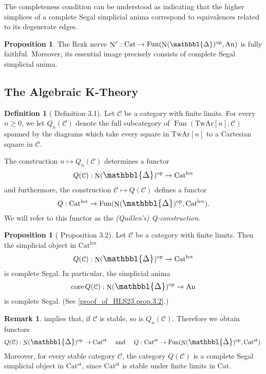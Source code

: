 \documentclass[a4paper,dvipdfmx,11pt,reqno]{amsart}
\DeclareMathOperator{\myop}{op}
\DeclareMathOperator{\N}{N}
\DeclareMathOperator{\Fun}{Fun}
\newcommand{\C}{\mathcal{C}}
\DeclareMathOperator{\core}{core}
\newcommand{\An}{\mathrm{An}}
\newcommand{\Cat}{\mathrm{Cat}}
\newcommand{\Catlex}{\mathrm{Cat^{lex}}}
\newcommand{\Catst}{\mathrm{Cat^{st}}}
\newcommand{\TwAr}{\mathrm{TwAr}}
\newcommand{\prism}{{\mathlarger{\mathbbl{\Delta}}}}
\theoremstyle{definition}
\newtheorem{definition}[theorem]{Definition}
\newtheorem{proposition}[theorem]{Proposition}
\newtheorem{remark}[theorem]{Remark}
\begin{document}
The completeness condition can be understood as indicating that the higher simplices of a complete Segal simplicial anima correspond to equivalences related to its degenerate edges.

\begin{proposition}
  The Rezk nerve $\N^r : \Cat \to \Fun(\N(\prism)^{\myop},\An)$ is fully faithful.
  Moreover, its essential image precisely consists of complete Segal simplicial anima.
\end{proposition}

\subsection{The Algebraic K-Theory}

\begin{definition}[\cite{HLS23} Definition 3.1] \label{HLS23.def.3.1}
  Let $\C$ be a category with finite limits.
  For every $n \geq 0$, we let $Q_{n}(\C)$ denote the full subcategory of $\Fun(\TwAr[n],\C)$ spanned by the diagrams which take every square in $\TwAr[n]$ to a Cartesian square in $\C$.

  The construction $n \mapsto Q_{n}(\C)$ determines a functor 
  \begin{align*}
    Q(\C) : \N(\prism)^{\myop} \to \Catlex
  \end{align*}
  and furthermore, the construction $\C \mapsto Q(\C)$ defines a functor 
  \begin{align*}
    Q : \Catlex \to \Fun(\N(\prism)^{\myop},\Catlex).
  \end{align*}
  We will refer to this functor as the \textit{(Quillen's) Q-construction}.
\end{definition}

\begin{proposition}[\cite{HLS23} Proposition 3.2] \label{HLS23.prop.3.2}
  Let $\C$ be a category with finite limits.
  Then the simplicial object in $\Catlex$
  \begin{align*}
    Q(\C) : \N(\prism)^{\myop} \to \Catlex
  \end{align*}
  is complete Segal.
  In particular, the simplicial anima 
  \begin{align*}
    \core Q(\C) : \N(\prism)^{\myop} \to \An
  \end{align*}
  is complete Segal.
  (See \cref{proof_of_HLS23.prop.3.2}.)
\end{proposition}

\begin{remark} \label{Ber.rem.4.32}
   implies that, if $\C$ is stable, so is $Q_n(\C)$.
  Therefore we obtain functors
  \begin{align*}
    Q(\C) : \N(\prism)^{\myop} \to \Catst 
    \quad \text{ and } \quad 
    Q : \Catst \to \Fun(\N(\prism)^{\myop},\Catst).
  \end{align*}
  Moreover, for every stable category $\C$, the category $Q(\C)$ is a complete Segal simplicial object in $\Catst$, since $\Catst$ is stable under finite limits in $\Cat$.
\end{remark}
\end{document}
